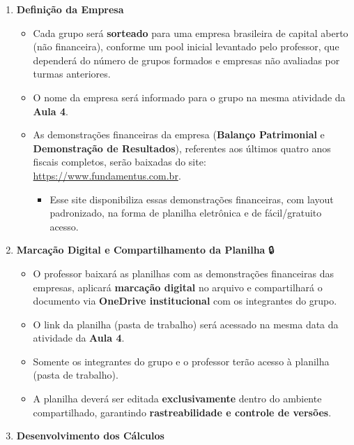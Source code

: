 \documentclass[
  a4paper,
]{book}
\providecommand{\tightlist}{%
  \setlength{\itemsep}{0pt}\setlength{\parskip}{0pt}}\usepackage{longtable,booktabs,array}
\begin{document}
\begin{enumerate}
\def\labelenumi{\arabic{enumi}.}
\setcounter{enumi}{1}
\item
  \textbf{Definição da Empresa} 🏢

  \begin{itemize}
  \item
    Cada grupo será \textbf{sorteado} para uma empresa brasileira de
    capital aberto (não financeira), conforme um pool inicial levantado
    pelo professor, que dependerá do número de grupos formados e
    empresas não avaliadas por turmas anteriores.\\
  \item
    O nome da empresa será informado para o grupo na mesma atividade da
    \textbf{Aula 4}.\\
  \item
    As demonstrações financeiras da empresa (\textbf{Balanço
    Patrimonial} e \textbf{Demonstração de Resultados}), referentes aos
    últimos quatro anos fiscais completos, serão baixadas do site:
    \url{https://www.fundamentus.com.br}.\\

    \begin{itemize}
    \tightlist
    \item
      Esse site disponibiliza essas demonstrações financeiras, com
      layout padronizado, na forma de planilha eletrônica e de
      fácil/gratuito acesso.
    \end{itemize}
  \end{itemize}
\item
  \textbf{Marcação Digital e Compartilhamento da Planilha} 🔒

  \begin{itemize}
  \item
    O professor baixará as planilhas com as demonstrações financeiras
    das empresas, aplicará \textbf{marcação digital} no arquivo e
    compartilhará o documento via \textbf{OneDrive institucional} com os
    integrantes do grupo.\\
  \item
    O link da planilha (pasta de trabalho) será acessado na mesma data
    da atividade da \textbf{Aula 4}.\\
  \item
    Somente os integrantes do grupo e o professor terão acesso à
    planilha (pasta de trabalho).\\
  \item
    A planilha deverá ser editada \textbf{exclusivamente} dentro do
    ambiente compartilhado, garantindo \textbf{rastreabilidade e
    controle de versões}.
  \end{itemize}
\item
  \textbf{Desenvolvimento dos Cálculos} 🧮


\end{enumerate}
\end{document}
